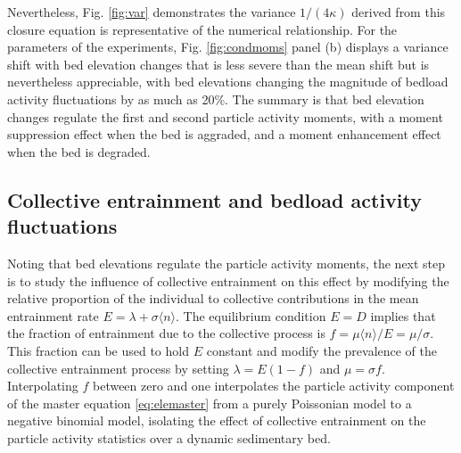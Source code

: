 Nevertheless, Fig. \ref{fig:var} demonstrates the variance $1/(4\kappa)$ derived from this closure equation is representative of the numerical relationship.
For the parameters of the \citet{Ancey2008} experiments, Fig. \ref{fig:condmoms} panel (b) displays a variance shift with bed elevation changes that is less severe than the mean shift but is nevertheless appreciable, with bed elevations changing the magnitude of bedload activity fluctuations by as much as 20\%.
The summary is that bed elevation changes regulate the first and second particle activity moments, with a moment suppression effect when the bed is aggraded, and a moment enhancement effect when the bed is degraded.

\subsection{Collective entrainment and bedload activity fluctuations}
\label{sec:elecolent}
Noting that bed elevations regulate the particle activity moments, the next step is to study the influence of collective entrainment on this effect by modifying the relative proportion of the individual to collective contributions in the mean entrainment rate $E=\lambda + \sigma \langle n \rangle $.
The equilibrium condition $E=D$ implies that the fraction of entrainment due to the collective process is $f = \mu\langle n \rangle/E = \mu/\sigma$. This fraction can be used to hold $E$ constant and modify the prevalence of the collective entrainment process by setting $\lambda = E(1-f)$ and $\mu= \sigma f$. Interpolating $f$ between zero and one interpolates the particle activity component of the master equation \ref{eq:elemaster} from a purely Poissonian model to a negative binomial model, isolating the effect of collective entrainment on the particle activity statistics over a dynamic sedimentary bed.
